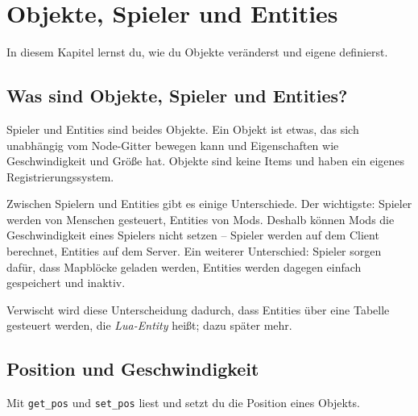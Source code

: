 \chapter{Objekte, Spieler und Entities}
\label{ch:map/objects}

In diesem Kapitel lernst du, wie du Objekte veränderst und eigene
definierst.

\section{Was sind Objekte, Spieler und
Entities?}\label{was-sind-objekte-spieler-und-entities}

Spieler und Entities sind beides Objekte. Ein
Objekt ist etwas, das sich unabhängig vom Node-Gitter bewegen kann und
Eigenschaften wie Geschwindigkeit und Größe hat. Objekte sind keine
Items und haben ein eigenes Registrierungssystem.

Zwischen Spielern und Entities gibt es einige Unterschiede. Der
wichtigste: Spieler werden von Menschen gesteuert, Entities von Mods.
Deshalb können Mods die Geschwindigkeit eines Spielers nicht setzen --
Spieler werden auf dem Client berechnet, Entities auf dem Server. Ein
weiterer Unterschied: Spieler sorgen dafür, dass Mapblöcke geladen
werden, Entities werden dagegen einfach gespeichert und inaktiv.

Verwischt wird diese Unterscheidung dadurch, dass Entities über eine
Tabelle gesteuert werden, die \emph{Lua-Entity} heißt; dazu später mehr.

\section{Position und
Geschwindigkeit}\label{position-und-geschwindigkeit}

Mit \texttt{get\_\allowbreak{}pos} und \texttt{set\_\allowbreak{}pos}
liest und setzt du die Position eines Objekts.

\begin{Shaded}
\begin{Highlighting}[]
  \OperatorTok{=} \OperatorTok{(}\OperatorTok{)}
  \OperatorTok{=} \OperatorTok{:}\OperatorTok{()}
\OperatorTok{:}\OperatorTok{(\{}  \OperatorTok{=} \OperatorTok{,}  \OperatorTok{=}  \OperatorTok{+} \OperatorTok{,}  \OperatorTok{=}  \OperatorTok{\})}
\end{Highlighting}
\end{Shaded}

